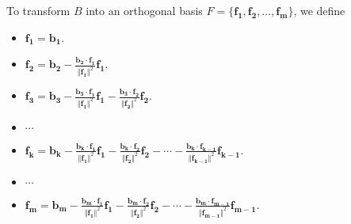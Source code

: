 \documentclass[20pt,a4paper]{extarticle}
\begin{document}
To transform $B$ into an orthogonal basis $F = \{ \mathbf{f_1} , \mathbf{f_2} , \ldots , \mathbf{f_m} \}$, we define
	\begin{itemize}[label=\textbullet]
		\item $\mathbf{f_1} = \mathbf{b_1}$.
		\item $\displaystyle\mathbf{f_2} = \mathbf{b_2} - \frac{\mathbf{b_2} \cdot \mathbf{f_1}}{\Vert \mathbf{f_1} \Vert^2} \mathbf{f_1}$.
		\item $\displaystyle\mathbf{f_3} = \mathbf{b_3} - \frac{\mathbf{b_3} \cdot \mathbf{f_1}}{\Vert \mathbf{f_1} \Vert^2} \mathbf{f_1} - \frac{\mathbf{b_3} \cdot \mathbf{f_2}}{\Vert \mathbf{f_2} \Vert^2} \mathbf{f_2}$. 
		\item $\cdots$
		\item $\displaystyle \mathbf{f_k} = \mathbf{b_k} - \frac{\mathbf{b_k \cdot \mathbf{f_1}}}{\Vert \mathbf{f_1} \Vert^2} \mathbf{f_1} - \frac{\mathbf{b_k} \cdot \mathbf{f_2}}{\Vert \mathbf{f_2}\Vert^2} \mathbf{f_2} - \cdots - \frac{\mathbf{b_k} \cdot \mathbf{f_{k - 1}}}{\Vert \mathbf{f_{k - 1}} \Vert^2} \mathbf{f_{k - 1}}$. 
		\item $\cdots$
		\item $\displaystyle \mathbf{f_m} = \mathbf{b_m} - \frac{\mathbf{b_m \cdot \mathbf{f_1}}}{\Vert \mathbf{f_1} \Vert^2} \mathbf{f_1} - \frac{\mathbf{b_m} \cdot \mathbf{f_2}}{\Vert \mathbf{f_2}\Vert^2} \mathbf{f_2} - \cdots - \frac{\mathbf{b_m} \cdot \mathbf{f_{m - 1}}}{\Vert \mathbf{f_{m - 1}} \Vert^2} \mathbf{f_{m - 1}}$.
	\end{itemize}
\end{document}
